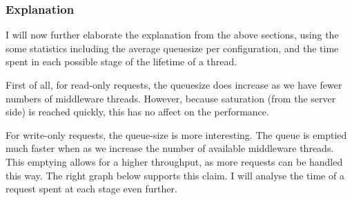 \documentclass[11pt,a4paper]{article}
\begin{document}
\subsubsection{Explanation}

I will now further elaborate the explanation from the above sections, using the some statistics including the average queuesize per configuration, and the time spent in each possible stage of the lifetime of a thread.

First of all, for read-only requests, the queuesize does increase as we have fewer numbers of middleware threads.
However, because saturation (from the server side) is reached quickly, this has no affect on the performance. 

For write-only requests, the queue-size is more interesting.
The queue is emptied much faster when as we increase the number of available middleware threads.
This emptying allows for a higher throughput, as more requests can be handled this way.
The right graph below supports this claim.
I will analyse the time of a request spent at each stage even further.
\end{document}
